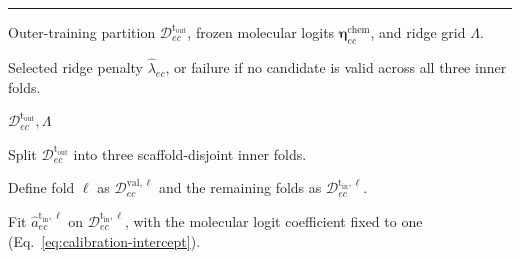 \documentclass[11pt,a4paper]{article}
\begin{document}
\begin{landscape}
\begingroup

\begin{table}[p]
\captionsetup{font=small,width=\linewidth,skip=6pt}
\caption{\textbf{Inner-loop ridge selection.}
Within each outer-training partition, three-fold inner cross-validation
selects the largest ridge penalty whose mean validation BCE lies within
one standard error of the minimum. Standardization, calibration, and
transcriptomic coefficients are estimated exclusively from the
corresponding inner-training partition. Abbreviations: BCE, binary
cross-entropy. \textbf{ALT TEXT:}
Algorithm table showing three-fold inner cross-validation in which
calibration and transcriptomic coefficients are fitted for each ridge
penalty, validation losses are averaged, and the final penalty is selected
using the one-standard-error rule.}
\label{tab:inner-validation}

\fontsize{11}{12}\selectfont
\setlength{\parskip}{0pt}
\setlength{\abovedisplayskip}{3pt}
\setlength{\belowdisplayskip}{3pt}

\noindent\rule{\linewidth}{0.8pt}\par\nobreak

\begin{algorithmic}[1]

\Require Outer-training partition
$\mathcal D_{ec}^{\mathrm{t_{out}}}$,
frozen molecular logits
$\boldsymbol\eta^{\mathrm{chem}}_{ec}$,
and ridge grid $\Lambda$.

\Ensure Selected ridge penalty
$\widehat\lambda_{ec}$, or failure if no candidate is valid
across all three inner folds.

{$\mathcal D_{ec}^{\mathrm{t_{out}}},\Lambda$}

    \State Split $\mathcal D_{ec}^{\mathrm{t_{out}}}$ into three
    scaffold-disjoint inner folds.


        \State Define fold $\ell$ as
        $\mathcal D_{ec}^{\mathrm{val},\ell}$
        and the remaining folds as
        $\mathcal D_{ec}^{\mathrm{t_{in}},\ell}$.

        \State Fit
        $\widehat a_{ec}^{\mathrm{t_{in}},\ell}$
        on $\mathcal D_{ec}^{\mathrm{t_{in}},\ell}$,
        with the molecular logit coefficient fixed to one
        (Eq.~\ref{eq:calibration-intercept}).


\end{algorithmic}
\end{table}
\end{landscape}
\end{document}
